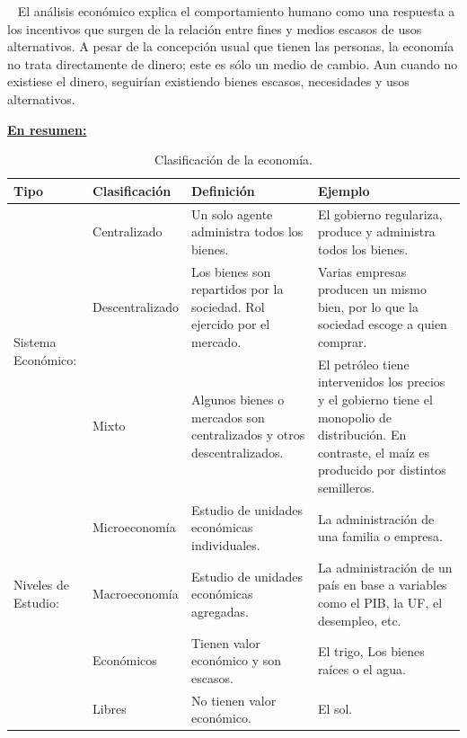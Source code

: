 \documentclass[
  letterpaper,
  DIV=11,
  numbers=noendperiod]{scrreport}
\begin{document}
~ El análisis económico explica el comportamiento humano como una
respuesta a los incentivos que surgen de la relación entre fines y
medios escasos de usos alternativos. A pesar de la concepción usual que
tienen las personas, la economía no trata directamente de dinero; este
es sólo un medio de cambio. Aun cuando no existiese el dinero, seguirían
existiendo bienes escasos, necesidades y usos alternativos.

\underline{\textbf{En resumen:}}

\begin{table}[htb]
    \centering
    \begin{tabular}{|p{20mm}|p{30mm}|p{45mm}|p{45mm}|}
        \hline
        Tipo & Clasificación & Definición & Ejemplo \\ \hline
        \multirow{3}{3cm}{Sistema Económico:} & Centralizado & \hspace{2mm} Un solo agente administra todos los bienes. & \hspace{2mm} El gobierno regulariza, produce y administra todos los bienes.\\ \cline{2-4}
        & Descentralizado & \hspace{2mm} Los bienes son repartidos por la sociedad. Rol ejercido por el mercado. & \hspace{2mm} Varias empresas producen un mismo bien, por lo que la sociedad escoge a quien comprar.\\ \cline{2-4}
        & Mixto & \hspace{2mm} Algunos bienes o mercados son centralizados y otros descentralizados. & \hspace{2mm} El petróleo tiene intervenidos los precios y el gobierno tiene el monopolio de distribución. En contraste, el maíz es producido por distintos semilleros.\\ \cline{1-4}
        \multirow{3}{3cm}{Niveles de Estudio:} & Microeconomía & \hspace{2mm} Estudio de unidades económicas individuales. & \hspace{2mm} La administración de una familia o empresa. \\ \cline{2-4}
        & Macroeconomía & \hspace{2mm} Estudio de unidades económicas agregadas. & \hspace{2mm} La administración de un país en base a variables como el PIB, la UF, el desempleo, etc. \\ \cline{1-4}
        \multirow{3}{3cm}{Recursos:} & Económicos & \hspace{2mm} Tienen valor económico y son escasos. & \hspace{2mm} El trigo, Los bienes raíces o el agua. \\ \cline{2-4}
        & Libres & \hspace{2mm} No tienen valor económico. & \hspace{2mm} El sol. \\ \cline{1-4}
    \end{tabular}
    \caption{Clasificación de la economía.}
    \label{tabla:final}
\end{table}
\end{document}
